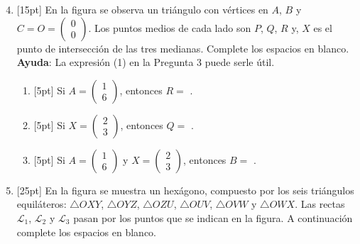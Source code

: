 \documentclass[11pt]{article}
\newcommand{\vect}[2]{\begin{pmatrix}#1\\#2\end{pmatrix}}
\begin{document}
\begin{enumerate}
\setcounter{enumi}{3}
\item{}[15pt] En la figura se observa un triángulo con vértices en $A$, $B$ y $C=O=\vect{0}{0}$. Los puntos medios de cada lado son $P$, $Q$, $R$ y, $X$ es el punto de intersección de las tres medianas. Complete los espacios en blanco. \textbf{Ayuda}: La expresión (1) en la Pregunta 3 puede serle útil.

\begin{center}
\end{center}

\begin{enumerate}[label=(\alph*)]
\item{}[5pt] Si $A=\vect{1}{6}$, entonces $R=$ \underline{\hspace{4cm}}.
\item{}[5pt] Si $X=\vect{2}{3}$, entonces $Q=$ \underline{\hspace{4cm}}.
\item{}[5pt] Si $A=\vect{1}{6}$ y $X=\vect{2}{3}$, entonces $B=$ \underline{\hspace{4cm}}.
\end{enumerate}

\item{}[25pt] En la figura se muestra un hexágono, compuesto por los seis triángulos equiláteros: $\triangle OXY$, $\triangle OYZ$, $\triangle OZU$, $\triangle OUV$, $\triangle OVW$ y $\triangle OWX$. Las rectas $\mathcal{L}_1$, $\mathcal{L}_2$ y $\mathcal{L}_3$ pasan por los puntos que se indican en la figura. A continuación complete los espacios en blanco.


\end{enumerate}
\end{document}

